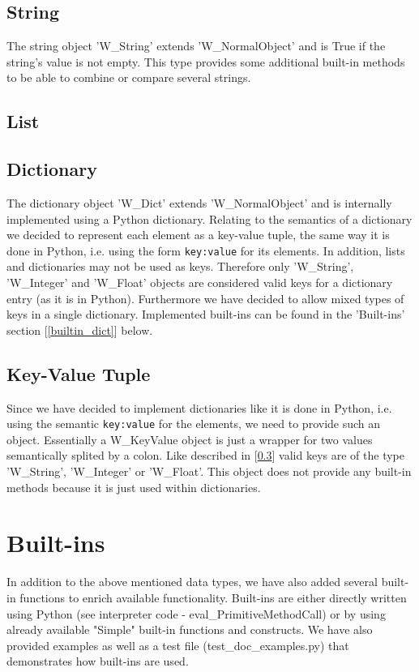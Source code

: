 \documentclass{article}
\begin{document}
\subsection{String}
The string object 'W\_String' extends 'W\_NormalObject' and is True if the string's value is not empty.
This type provides some additional built-in methods to be able to combine or compare several strings.

\subsection{List}

\subsection{Dictionary}
\label{dicts}
The dictionary object 'W\_Dict' extends 'W\_NormalObject' and is internally implemented using a Python dictionary.
Relating to the semantics of a dictionary we decided to represent each element as a key-value tuple, the same way it is done in Python, i.e. using the form \texttt{key:value} for its elements. In addition, lists and dictionaries may not be used as keys. Therefore only 'W\_String', 'W\_Integer' and 'W\_Float' objects are considered valid keys for a dictionary entry (as it is in Python). Furthermore we have decided to allow mixed types of keys in a single dictionary. Implemented built-ins can be found in the 'Built-ins' section [\ref{builtin_dict}] below.

\subsection{Key-Value Tuple}
Since we have decided to implement dictionaries like it is done in Python, i.e. using the semantic \texttt{key:value} for the elements, we need to provide such an object.
Essentially a W\_KeyValue object is just a wrapper for two values semantically splited by a colon.
Like described in [\ref{dicts}] valid keys are of the type 'W\_String', 'W\_Integer' or 'W\_Float'. This object does not provide any built-in methods because it is just used within dictionaries.

\section{Built-ins}
In addition to the above mentioned data types, we have also added several built-in functions to enrich available functionality. Built-ins are either directly written using Python (see interpreter code - eval\_PrimitiveMethodCall) or by using already available "Simple" built-in functions and constructs. We have also provided examples as well as a test file (test\_doc\_examples.py) that demonstrates how built-ins are used.
\end{document}
